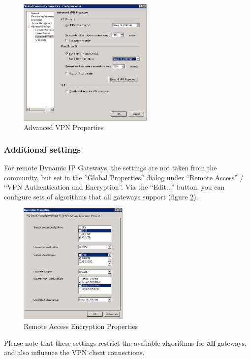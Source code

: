 \begin{figure}[p]
  \centering
  \includegraphics[width=0.589\textwidth]{img/checkpoint_3.png}
  \caption{Advanced VPN Properties}
  \label{fig:checkpoint_3}
\end{figure}


\subsubsection{Additional settings}
For remote Dynamic IP Gateways, the settings are not taken from the
community, but set in the ``Global Properties'' dialog under ``Remote
Access'' / ``VPN Authentication and Encryption''. Via the ``Edit...''
button, you can configure sets of algorithms that all gateways support
(figure \ref{fig:checkpoint_4}).

\begin{figure}[p]
  \centering
  \includegraphics[width=0.474\textwidth]{img/checkpoint_4.png}
  \caption{Remote Access Encryption Properties}
  \label{fig:checkpoint_4}
\end{figure}

Please note that these settings restrict the available algorithms for
\textbf{all} gateways, and also influence the VPN client connections.


